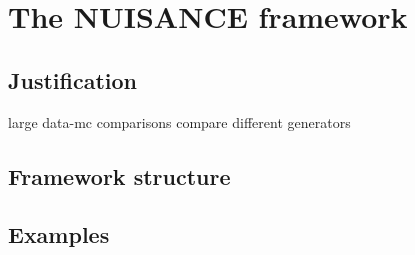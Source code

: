 \chapter{The NUISANCE framework}
\label{chap:NUISANCE}

\section{Justification}
\label{chap:NUISANCE:justification}
large data-mc comparisons
compare different generators

\section{Framework structure}
\label{chap:NUISANCE:framework}

\section{Examples}
\label{chap:NUISANCE:examples}